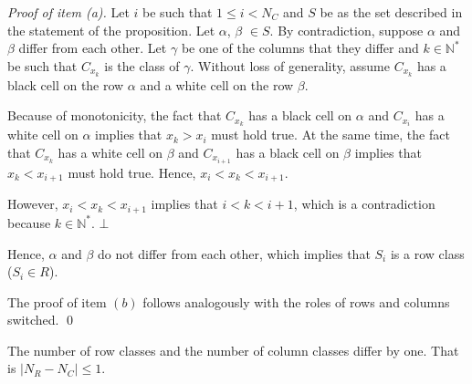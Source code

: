 
\begin{proof}[Proof of item (a)]
Let $i$ be such that $1 \leq i < N_{C}$ and $S$ be as the set described in 
the statement of the proposition.
Let $\alpha$, $\beta$ $\in S$.
By contradiction, suppose $\alpha$ and $\beta$ differ from each other. Let $\gamma$ be one of the columns that they differ and $k \in \mathbb{N}^{*}$ be such that $C_{x_{k}}$ is the class of $\gamma$.
Without loss of generality, assume $C_{x_{k}}$ has a black cell on the row $\alpha$ and a white cell on the row $\beta$.

Because of monotonicity, the fact that $C_{x_{k}}$ has a black cell on $\alpha$ and $C_{x_{i}}$ has a white cell on $\alpha$ implies that $x_{k} > x_{i}$ must hold true. At the same time, the fact that $C_{x_{k}}$ has a white cell on $\beta$ and $C_{x_{i+1}}$ has a black cell on $\beta$ implies that $x_{k} < x_{i+1}$ must hold true. Hence, $x_{i} < x_{k} < x_{i+1}$.

However, $x_{i} < x_{k} < x_{i+1}$ implies that $i < k < i+1$, which is a contradiction because $k \in \mathbb{N}^{*}$. $\bot$

Hence, $\alpha$ and $\beta$ do not differ from each other, which implies that $S_{i}$ is a row class ($S_{i} \in R$).

The proof of item $(b)$ follows analogously with the roles of rows and columns switched.
\qed
\end{proof}


\begin{proposition}
\label{lemma_num_rows_col_differ_one}
The number of row classes and the number of column classes differ by one. That is $\lvert N_{R} - N_{C} \rvert \leq 1$.
\end{proposition}


